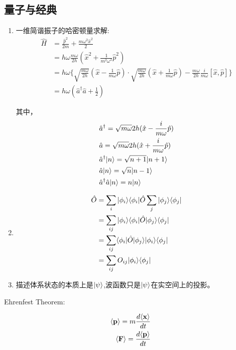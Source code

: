 \subsection{量子与经典}

\begin{enumerate}
	\item 一维简谐振子的哈密顿量求解:
	\begin{align*}
	\hat{H}&=\frac{\hat{p}^2}{2m}+\frac{m\omega^2\hat{x}^2}{2}\\
			&=h\omega\frac{m\omega}{2h}(\hat{x}^2+\frac{1}{m^2\omega^2}\hat{p}^2)\\
			&=h\omega\{\sqrt{\frac{m\omega}{2h}}(\hat{x}-\frac{1}{m\omega}\hat{p})\cdot\sqrt{\frac{m\omega}{2h}}(\hat{x}+\frac{1}{m\omega}\hat{p})-\frac{m\omega}{2h}\frac{i}{m\omega}[\hat{x},\hat{p}]\}\\
			&=h\omega(\hat{a}^\dagger \hat{a}+\frac{1}{2})
			\end{align*}

			其中，
			\begin{align}
			&\hat{a}^\dagger=\sqrt{m\omega}{2h}(\hat{x}-\frac{i}{m\omega}\hat{p})\\
			&\hat{a}=\sqrt{m\omega}{2h}(\hat{x}+\frac{i}{m\omega}\hat{p})\\
			&\hat{a}^\dagger| n \rangle=\sqrt{n+1}| n+1 \rangle\\
			&\hat{a}| n \rangle=\sqrt{n}| n-1 \rangle\\
			&\hat{a}^\dagger\hat{a}| n \rangle=n| n \rangle\\
			\end{align}


	\item 
	\begin{align*}
	\hat{O} & = \sum_i | \phi _i \rangle \langle \phi_i | \hat{O} \sum_j | \phi _j \rangle \langle \phi_j | \\
			& = \sum_{ij} | \phi_i \rangle \langle \phi_i | \hat{O} | \phi_j \rangle\langle \phi_j |\\
			& = \sum_{ij} \langle \phi_i | \hat{O} | \phi_j \rangle | \phi_i \rangle\langle \phi_j |\\
			& = \sum_{ij} O_{ij} | \phi_i \rangle\langle \phi_j |
			\end{align*}

	\item 描述体系状态的本质上是$| \psi \rangle$,波函数只是$| \psi \rangle$在实空间上的投影。

\end{enumerate}

\begin{theorem}
Ehrenfest Theorem:

\begin{align}
\langle \textbf{p} \rangle= m \frac{d \langle \textbf{x} \rangle}{dt}\\
\langle \textbf{F} \rangle= \frac{d\langle \textbf{p} \rangle}{dt}
\end{align}
\end{theorem}

